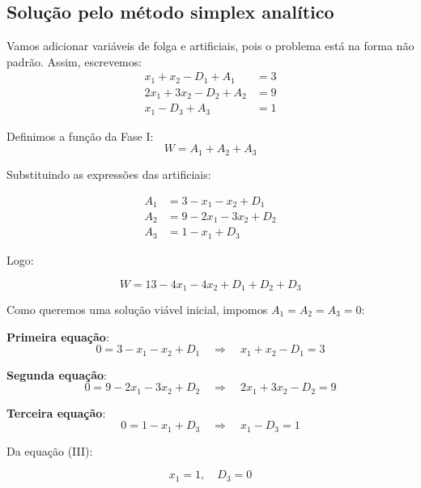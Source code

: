 \documentclass[12pt, a4paper]{article}
\begin{document}
\cleardoublepage

\subsection[Método simplex analítico]{Solução pelo método simplex analítico}
Vamos adicionar variáveis de folga e artificiais, pois o problema está na forma não padrão. Assim, escrevemos:
\begin{align*}
x_1 + x_2 - D_1 + A_1 &= 3 \\
2x_1 + 3x_2 - D_2 + A_2 &= 9 \\
x_1 - D_3 + A_3 &= 1 
\end{align*}

Definimos a função da Fase I:\@
\begin{equation*}
  W = A_1 + A_2 + A_3
\end{equation*}


Substituindo as expressões das artificiais:

\begin{align*}
  A_1 &= 3 - x_1 - x_2 + D_1 \\
  A_2 &= 9 - 2x_1 - 3x_2 + D_2 \\
  A_3 &= 1 - x_1 + D_3
\end{align*}

Logo:

\begin{equation*}
  W = 13 - 4x_1 - 4x_2 + D_1 + D_2 + D_3
\end{equation*}

Como queremos uma solução viável inicial, impomos $A_1 = A_2 = A_3 = 0$:

\textbf{Primeira equação}:
\begin{equation*}
  0 = 3 - x_1 - x_2 + D_1 \quad \Rightarrow \quad x_1 + x_2 - D_1 = 3 \tag{I}
\end{equation*}

\textbf{Segunda equação}:
\begin{equation*}
  0 = 9 - 2x_1 - 3x_2 + D_2 \quad \Rightarrow \quad 2x_1 + 3x_2 - D_2 = 9 \tag{II}
\end{equation*}

\textbf{Terceira equação}:
\begin{equation*}
  0 = 1 - x_1 + D_3 \quad \Rightarrow \quad x_1 - D_3 = 1 \tag{III}
\end{equation*}

Da equação (III):

\begin{equation*}
  x_1 = 1, \quad D_3 = 0
\end{equation*}
\end{document}
